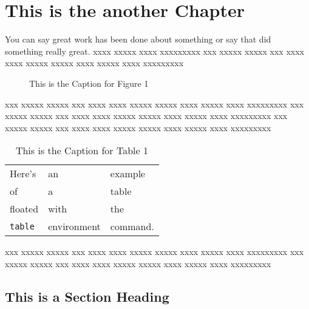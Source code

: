 
 
\chapter{This is the another Chapter}
 
You can say great work has been done about something \citep{Castleman98,Granlund95} or say that \citet{Holmes95} did something really great.
xxxx xxxxx xxxx xxxxxxxxx 
xxx xxxxx xxxxx xxx xxxx xxxx xxxxx xxxxx xxxx xxxxx xxxx xxxxxxxxx
 
\begin{figure}
\vspace{2.0in}
\caption{This is the Caption for Figure 1}
\end{figure}
 
xxx xxxxx xxxxx xxx xxxx xxxx xxxxx xxxxx xxxx xxxxx xxxx xxxxxxxxx
xxx xxxxx xxxxx xxx xxxx xxxx xxxxx xxxxx xxxx xxxxx xxxx xxxxxxxxx
xxx xxxxx xxxxx xxx xxxx xxxx xxxxx xxxxx xxxx xxxxx xxxx xxxxxxxxx
 
\begin{table}[t]
\begin{center}
\begin{tabular}{lll}
Here's       & an          & example  \\
of           & a           & table    \\
floated      & with        & the      \\
\verb+table+ & environment & command.
\end{tabular}
\end{center}
\caption{This is the Caption for Table 1}
\end{table}
 
xxx xxxxx xxxxx xxx xxxx xxxx xxxxx xxxxx xxxx xxxxx xxxx xxxxxxxxx
xxx xxxxx xxxxx xxx xxxx xxxx xxxxx xxxxx xxxx xxxxx xxxx xxxxxxxxx
 
\section{This is a Section Heading}
 
